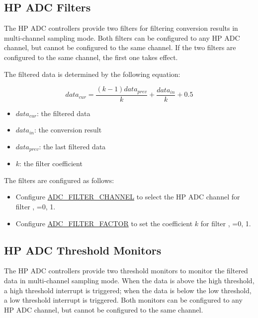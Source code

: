 \documentclass[main\_\_EN.tex]{subfiles}
\begin{document}
\subsection{HP ADC Filters}\label{sec:adc_filter}

The HP ADC controllers provide two filters for filtering conversion results in multi-channel sampling mode. Both filters can be configured to any HP ADC channel, but cannot be configured to the same channel. If the two filters are configured to the same channel, the first one takes effect.

The filtered data is determined by the following equation:

\[data_{cur} = \frac{(k-1)data_{prev}}{k}+\frac{data_{in}}{k}+0.5\]

\begin{itemize}
    \item \(data_{cur}\): the filtered data
    \item \(data_{in}\): the conversion result
    \item \(data_{prev}\): the last filtered data
    \item \(k\): the filter coefficient
\end{itemize}

The filters are configured as follows:

\begin{itemize}
\item Configure \hyperref[fielddesc:ADCFILTERCHANNEL0]{ADC\_FILTER\_CHANNEL} to select the HP ADC channel for filter , =0, 1.
\item Configure \hyperref[fielddesc:ADCFILTERFACTOR0]{ADC\_FILTER\_FACTOR} to set the coefficient \(k\) for filter , =0, 1.
\end{itemize}

\subsection{HP ADC Threshold Monitors}\label{sec:adc_threshold}

The HP ADC controllers provide two threshold monitors to monitor the filtered data in multi-channel sampling mode. When the data is above the high threshold, a high threshold interrupt is triggered; when the data is below the low threshold, a low threshold interrupt is triggered. Both monitors can be configured to any HP ADC channel, but cannot be configured to the same channel.
\end{document}
